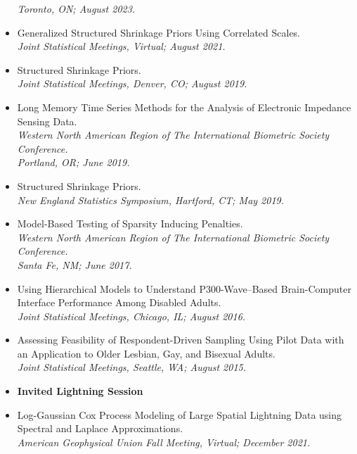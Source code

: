 \documentclass[11pt]{article}
\newcommand{\tab}{\hspace*{2em}}
\begin{document}
\begin{itemize}
	\tab \emph{Toronto, ON; August 2023.} \vspace{-2mm}
	\item[] Generalized Structured Shrinkage Priors Using Correlated Scales. \\
	\tab \emph{Joint Statistical Meetings, Virtual; August 2021.} \vspace{-2mm}
	\item[] Structured Shrinkage Priors. \\
	\tab \emph{Joint Statistical Meetings, Denver, CO; August 2019.} \vspace{-2mm}
	\item[] Long Memory Time Series Methods for the Analysis of Electronic Impedance Sensing Data. \\
	\tab \emph{Western North American Region of The International Biometric Society Conference.} \\
	\tab \emph{Portland, OR; June 2019.} \vspace{-2mm}
	\item[] Structured Shrinkage Priors. \\
	\tab \emph{New England Statistics Symposium, Hartford, CT; May 2019.} \vspace{-2mm}
	\item[] Model-Based Testing of Sparsity Inducing Penalties. \\
	\tab \emph{Western North American Region of The International Biometric Society Conference.} \\
	\tab \emph{Santa Fe, NM; June 2017.} \vspace{-2mm}
	\item[] Using Hierarchical Models to Understand P300-Wave--Based Brain-Computer Interface Performance Among Disabled Adults. \\
	\tab \emph{Joint Statistical Meetings, Chicago, IL; August 2016.} \vspace{-2mm}
	\item[] Assessing Feasibility of Respondent-Driven Sampling Using Pilot Data with an Application to Older Lesbian, Gay, and Bisexual Adults. \\
	\tab \emph{Joint Statistical Meetings, Seattle, WA; August 2015.} 
	\item[] \textbf{Invited Lightning Session}\vspace{-2mm}
	\item[] Log-Gaussian Cox Process Modeling of Large Spatial Lightning Data using Spectral and Laplace Approximations. \\
	\tab \emph{American Geophysical Union Fall Meeting, Virtual; December 2021.}\vspace{-2mm}

\end{itemize}
\end{document}
